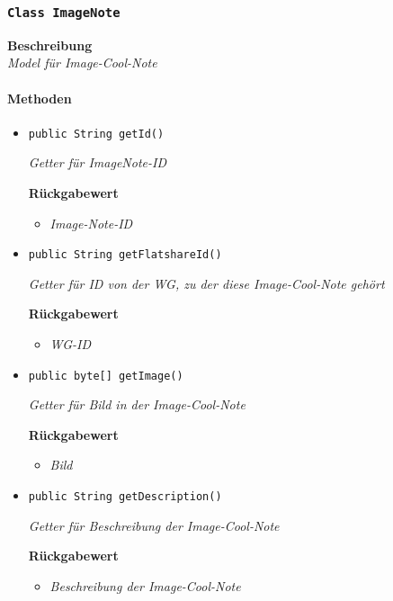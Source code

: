      \subsubsection{\texttt{Class ImageNote}}
     \textbf{Beschreibung} \\
     \textit{Model für Image-Cool-Note}
     \paragraph*{Methoden}
     \begin{itemize}
     	\item{\texttt{public String getId()}}
     	
     	\textit{Getter für ImageNote-ID}
     	
     	\textbf{Rückgabewert}
     	\begin{itemize}
     		\item\textit{Image-Note-ID}
     	\end{itemize}
     
     \item{\texttt{public String getFlatshareId()}}
     	
     	\textit{Getter für ID von der WG, zu der diese Image-Cool-Note gehört}
     	
     	\textbf{Rückgabewert}
     	\begin{itemize}
     		\item\textit{WG-ID}
     	\end{itemize}
     
     \item{\texttt{public byte[] getImage()}}
     	
     	\textit{Getter für Bild in der Image-Cool-Note}
     	
     	\textbf{Rückgabewert}
     	\begin{itemize}
     		\item\textit{Bild}
     	\end{itemize}
     
     \item{\texttt{public String getDescription()}}
     	
     	\textit{Getter für Beschreibung der Image-Cool-Note}
     	
     	\textbf{Rückgabewert}
     	\begin{itemize}
     		\item\textit{Beschreibung der Image-Cool-Note}
     	\end{itemize}
     

\end{itemize}

